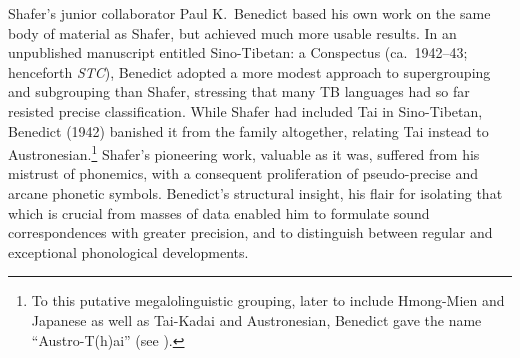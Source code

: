 Shafer’s junior collaborator Paul K.\ Benedict based his own work on the same body of material as Shafer, but achieved much more usable results. In an unpublished manuscript entitled Sino-Tibetan: a Conspectus (ca.\ 1942–43; henceforth \textit{STC}), Benedict adopted a more modest approach to supergrouping and subgrouping than Shafer, stressing that many TB languages had so far resisted precise classification. While Shafer had included Tai in Sino-Tibetan, Benedict (1942) banished it from the family altogether, relating Tai instead to Austronesian.\footnote{To this putative megalolinguistic grouping, later to include Hmong-Mien and Japanese as well as Tai-Kadai and Austronesian, Benedict gave the name “Austro-T(h)ai” (see \citealt{PB-ATLC,PB-ATJ}).} Shafer’s pioneering work, valuable as it was, suffered from his mistrust of phonemics, with a consequent proliferation of pseudo-precise and arcane phonetic symbols. Benedict’s structural insight, his flair for isolating that which is crucial from masses of data  enabled him to formulate sound correspondences with greater precision, and to distinguish between regular and exceptional phonological developments.


